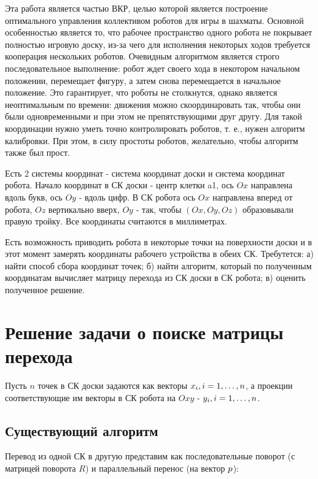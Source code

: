 \documentclass[a4paper,12pt]{extarticle}
\begin{document}


\tableofcontents
\pagebreak


Эта работа является частью ВКР, целью которой является построение оптимального управления коллективом роботов для игры в шахматы. Основной особенностью является то, что рабочее пространство одного робота не покрывает полностью игровую доску, из-за чего для исполнения некоторых ходов требуется кооперация нескольких роботов. Очевидным алгоритмом является строго последовательное выполнение: робот ждет своего хода в некотором начальном положении, перемещает фигуру, а затем снова перемещается в начальное положение. Это гарантирует, что роботы не столкнутся, однако является неоптимальным по времени: движения можно скоординаровать так, чтобы они были одновременными и при этом не препятствующими друг другу. Для такой координации нужно уметь точно контролировать роботов, т. е., нужен алгоритм калибровки. При этом, в силу простоты роботов, желательно, чтобы алгоритм также был прост.


Есть 2 системы координат - система координат доски и система координат робота. Начало координат в СК доски - центр клетки a1, ось $Ox$ направлена вдоль букв, ось $Oy$ - вдоль цифр. 
В СК робота ось $Ox$ направлена вперед от робота, $Oz$ вертикально вверх, $Oy$ - так, чтобы $(Ox, Oy, Oz)$ образовывали правую тройку.
Все координаты считаются в миллиметрах.

Есть возможность приводить робота в некоторые точки на поверхности доски и в этот момент замерять координаты рабочего устройства в обеих СК.
Требутется:
 а) найти способ сбора координат точек;
 б) найти алгоритм, который по полученным координатам вычисляет матрицу перехода из СК доски в СК робота;
 в) оценить полученное решение.

\pagebreak

\section{Решение задачи о поиске матрицы перехода}

Пусть $n$ точек в СК доски задаются как векторы $\boldmath{x}_i, i=1,\dots,n$, а проекции соответствующие им векторы в СК робота на $Oxy$ - $\boldmath{y}_i, i=1,\dots,n$.

\subsection{Существующий алгоритм}
Перевод из одной СК в другую представим как последовательные поворот (с матрицей поворота $R$) и параллельный перенос (на вектор $\boldmath{p}$):
\end{document}
